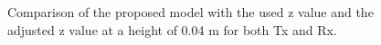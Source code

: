 


 \begin{figure}[H]
\centering

\caption{Comparison of the proposed model with the used z value and the adjusted z value at a height of 0.04 m for both Tx and Rx.}
\label{Modelzadjust}
\end{figure}    
